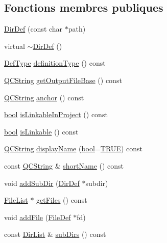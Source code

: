 \subsection*{Fonctions membres publiques}
\begin{DoxyCompactItemize}
\item 
\hyperlink{class_dir_def_a2f7a368e7ad34ed71796f6a9a696d547}{Dir\+Def} (const char $\ast$path)
\item 
virtual \hyperlink{class_dir_def_a75207c15e597a0aa8539bae91809ff69}{$\sim$\+Dir\+Def} ()
\item 
\hyperlink{class_definition_intf_ada60114bc621669dd8c19edfc6421766}{Def\+Type} \hyperlink{class_dir_def_a555b75377a532e245d82475cddfe2f19}{definition\+Type} () const 
\item 
\hyperlink{class_q_c_string}{Q\+C\+String} \hyperlink{class_dir_def_a45b42037a0ed21aaba3950e7fb53fbd9}{get\+Output\+File\+Base} () const 
\item 
\hyperlink{class_q_c_string}{Q\+C\+String} \hyperlink{class_dir_def_aceaa272039d360a7a4e64d2584b8eb87}{anchor} () const 
\item 
\hyperlink{qglobal_8h_a1062901a7428fdd9c7f180f5e01ea056}{bool} \hyperlink{class_dir_def_a6f4bf73e2fd28f421f4359b0135187b6}{is\+Linkable\+In\+Project} () const 
\item 
\hyperlink{qglobal_8h_a1062901a7428fdd9c7f180f5e01ea056}{bool} \hyperlink{class_dir_def_ad47c93357ab08fb4f883d29e903f1570}{is\+Linkable} () const 
\item 
\hyperlink{class_q_c_string}{Q\+C\+String} \hyperlink{class_dir_def_a360c7e6d3deaf6782329a019c80b110a}{display\+Name} (\hyperlink{qglobal_8h_a1062901a7428fdd9c7f180f5e01ea056}{bool}=\hyperlink{qglobal_8h_a04a6422a52070f0dc478693da640242b}{T\+R\+U\+E}) const 
\item 
const \hyperlink{class_q_c_string}{Q\+C\+String} \& \hyperlink{class_dir_def_a3bb0aa9abe3046f973c9588b4a4424f7}{short\+Name} () const 
\item 
void \hyperlink{class_dir_def_a104e5839f46ae7804bcc99fe020bc391}{add\+Sub\+Dir} (\hyperlink{class_dir_def}{Dir\+Def} $\ast$subdir)
\item 
\hyperlink{class_file_list}{File\+List} $\ast$ \hyperlink{class_dir_def_aa2fe2f19c314bad8df819c12cd84ef0a}{get\+Files} () const 
\item 
void \hyperlink{class_dir_def_ae61d8b61fce7dc841ffa59b1bee07027}{add\+File} (\hyperlink{class_file_def}{File\+Def} $\ast$fd)
\item 
const \hyperlink{class_dir_list}{Dir\+List} \& \hyperlink{class_dir_def_a1ab1d6b16353f278ef41fc23f848bb56}{sub\+Dirs} () const 

\end{DoxyCompactItemize}
